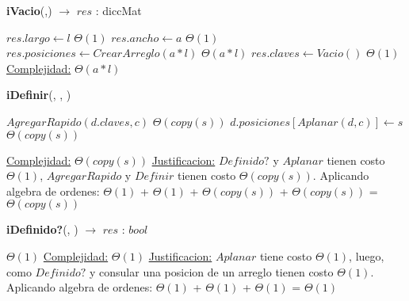 \begin{Algoritmos}

\medskip
	
  	\medskip
  
\begin{algorithm}[H]{\textbf{iVacio}(,) $\to$ $res$ : diccMat}
    	\begin{algorithmic}[1]
			\State $res.largo \gets l$ \Comment $\Theta(1)$
			\State $res.ancho \gets a$ \Comment $\Theta(1)$
			\State $res.posiciones \gets CrearArreglo(a * l)$ \Comment $\Theta(a*l)$
			\State $res.claves \gets Vacio()$ \Comment $\Theta(1)$
			\medskip
			\Statex \underline{Complejidad:} $\Theta(a*l)$
        \end{algorithmic}
\end{algorithm}

\begin{algorithm}[H]{\textbf{iDefinir}(, , )}
    	\begin{algorithmic}[1]
                \State $AgregarRapido(d.claves, c)$ \Comment $\Theta(copy(s))$
            \EndIf
            \State $d.posiciones[Aplanar(d, c)] \gets s$ \Comment $\Theta(copy(s))$
			
			\medskip
			\Statex \underline{Complejidad:} $\Theta(copy(s))$
            \Statex \underline{Justificacion:} $Definido?$ y $Aplanar$ tienen costo $\Theta(1)$, $AgregarRapido$ y $Definir$ tienen costo $\Theta(copy(s))$. Aplicando algebra de ordenes: $\Theta(1)$ + $\Theta(1)$ + $\Theta(copy(s))$  + $\Theta(copy(s))$ = $\Theta(copy(s))$
        \end{algorithmic}
\end{algorithm}

\begin{algorithm}[H]{\textbf{iDefinido?}(, ) $\to$ $res$ : $bool$}
    	\begin{algorithmic}[1]
          $\Theta(1)$
			\medskip
			\Statex \underline{Complejidad:} $\Theta(1)$
            \Statex \underline{Justificacion:} $Aplanar$ tiene costo $\Theta(1)$, luego, como $Definido?$ y consular una posicion de un arreglo tienen costo $\Theta(1)$. Aplicando algebra de ordenes: $\Theta(1)$ + $\Theta(1)$ + $\Theta(1)$ = $\Theta(1)$
        \end{algorithmic}
\end{algorithm}


\end{Algoritmos}
